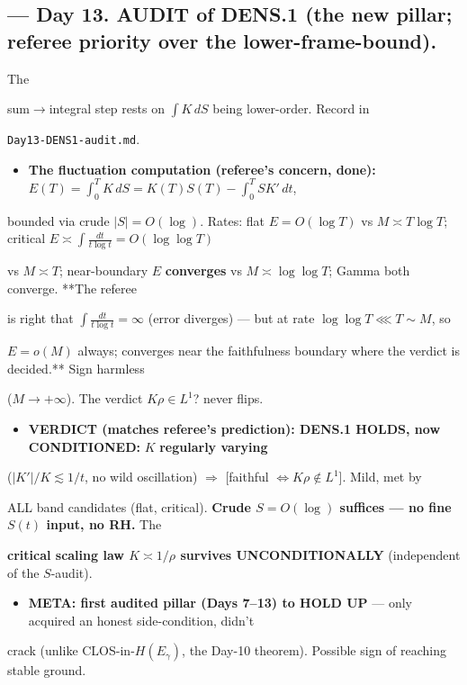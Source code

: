 \documentclass[10pt]{article}
\begin{document}
\subsection*{ --- Day 13. AUDIT of DENS.1 (the new pillar; referee priority over the lower-frame-bound).}
The\par
sum$\to$integral step rests on $\int K\,dS$ being lower-order. Record in\par
\texttt{Day13-DENS1-audit.md}.\par
\begin{itemize}
\item \textbf{The fluctuation computation (referee's concern, done):} $E(T)=\int_0^T K\,dS=K(T)S(T)-\int_0^T SK'\,dt$,
\end{itemize}
  bounded via crude $|S|=O(\log)$. Rates: flat $E=O(\log T)$ vs $M\asymp T\log T$; critical $E\asymp\int\frac{dt}{t\log t}=O(\log\log T)$\par
  vs $M\asymp T$; near-boundary $E$ \textbf{converges} vs $M\asymp\log\log T$; Gamma both converge. **The referee\par
  is right that $\int\frac{dt}{t\log t}=\infty$ (error diverges) --- but at rate $\log\log T\lll T\sim M$, so\par
  $E=o(M)$ always; converges near the faithfulness boundary where the verdict is decided.** Sign harmless\par
  ($M\to+\infty$). The verdict $K\rho\in L^1$? never flips.\par
\begin{itemize}
\item \textbf{VERDICT (matches referee's prediction): DENS.1 HOLDS, now CONDITIONED:} $K$ \textbf{regularly varying}
\end{itemize}
  ($|K'|/K\lesssim1/t$, no wild oscillation) $\Rightarrow$ [faithful $\iff K\rho\notin L^1$]. Mild, met by\par
  ALL band candidates (flat, critical). \textbf{Crude $S=O(\log)$ suffices --- no fine $S(t)$ input, no RH.} The\par
  \textbf{critical scaling law $K\asymp1/\rho$ survives UNCONDITIONALLY} (independent of the $S$-audit).\par
\begin{itemize}
\item \textbf{META: first audited pillar (Days 7--13) to HOLD UP} --- only acquired an honest side-condition, didn't
\end{itemize}
  crack (unlike CLOS-in-$H(E_\gamma)$, the Day-10 theorem). Possible sign of reaching stable ground.\par
\end{document}

